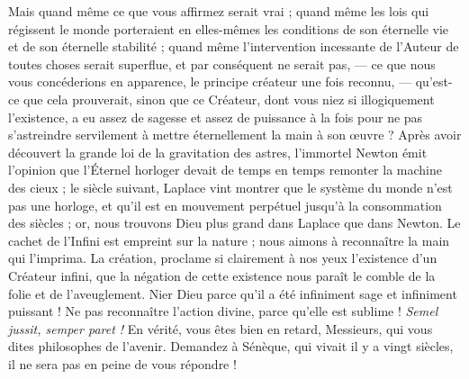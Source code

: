 \documentclass[a4paper, 11pt, oneside, landscape]{article}
\begin{document}
Mais quand même ce que vous affirmez serait vrai ; quand même les lois qui régissent le monde porteraient en elles-mêmes les conditions de son éternelle vie et de son éternelle stabilité ; quand même l'intervention incessante de l'Auteur de toutes choses serait superflue, et par conséquent ne serait pas, --- ce que nous vous concéderions en apparence, le principe créateur une fois reconnu, --- qu'est-ce que cela prouverait, sinon que ce Créateur, dont vous niez si illogiquement l'existence, a eu assez de sagesse et assez de puissance à la fois pour ne pas s'astreindre servilement à mettre éternellement la main à son œuvre ? Après avoir découvert la grande loi de la gravitation des astres, l'immortel Newton émit l'opinion que l'Éternel horloger devait de temps en temps remonter la machine des cieux ; le siècle suivant, Laplace vint montrer que le système du monde n'est pas une horloge, et qu'il est en mouvement perpétuel jusqu'à la consommation des siècles ; or, nous trouvons Dieu plus grand dans Laplace que dans Newton. Le cachet de l'Infini est empreint sur la nature ; nous aimons à reconnaître la main qui l'imprima. La création, proclame si clairement à nos yeux l'existence d'un Créateur infini, que la négation de cette existence nous paraît le comble de la folie et de l'aveuglement. Nier Dieu parce qu'il a été infiniment sage et infiniment puissant ! Ne pas reconnaître l'action divine, parce qu'elle est sublime ! \emph{Semel jussit, semper paret !} En vérité, vous êtes bien en retard, Messieurs, qui vous dites philosophes de l'avenir. Demandez à Sénèque, qui vivait il y a vingt siècles, il ne sera pas en peine de vous répondre !
\end{document}
